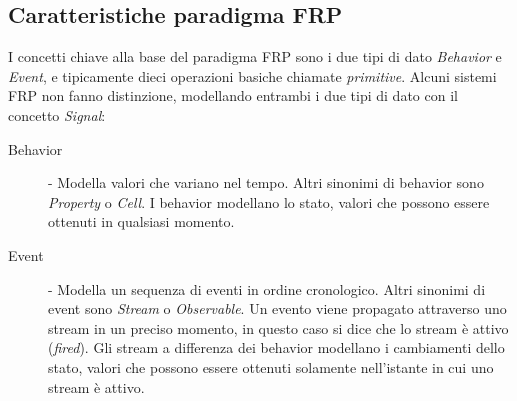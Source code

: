 \documentclass[../main.tex]{subfiles}
\begin{document}

\subsection{Caratteristiche paradigma FRP}
I concetti chiave alla base del paradigma FRP sono i due tipi di dato \textit{Behavior} e \textit{Event}, e tipicamente dieci operazioni basiche chiamate \textit{primitive}. Alcuni sistemi FRP non fanno distinzione, modellando entrambi i due tipi di dato con il concetto \textit{Signal}:
\begin{description}
    \item[Behavior] - Modella valori che variano nel tempo. Altri sinonimi di behavior sono \textit{Property} o \textit{Cell}. I behavior modellano lo stato, valori che possono essere ottenuti in qualsiasi momento.
    \item[Event] - Modella un sequenza di eventi in ordine cronologico. Altri sinonimi di event sono \textit{Stream} o \textit{Observable}. Un evento viene propagato attraverso uno stream in un preciso momento, in questo caso si dice che lo stream è attivo (\textit{fired}). Gli stream a differenza dei behavior modellano i cambiamenti dello stato, valori che possono essere ottenuti solamente nell'istante in cui uno stream è attivo.
\end{description}
\end{document}
